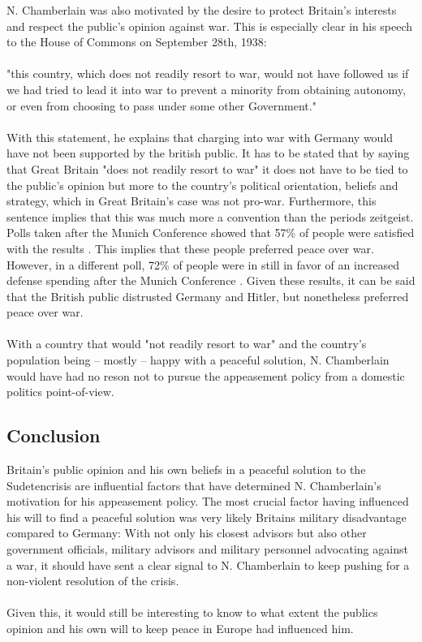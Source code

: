 \documentclass[10pt, a4papert, hidelinks]{article}
\begin{document}
N. Chamberlain was also motivated by the desire to protect Britain's interests and respect the public's opinion against war. This is especially clear in his speech to the House of Commons on September 28th, 1938:\\\\
"this country, which does not readily resort to war, would not have followed us if we had tried to lead it into war to prevent a  minority from obtaining autonomy, or even from choosing to pass under some other Government." \cite{prime_minister_statement_common_sittings_european_situation}\\\\
With this statement, he explains that charging into war with Germany would have not been supported by the british public. It has to be stated that by saying that Great Britain "does not readily resort to war" it does not have to be tied to the public's opinion but more to the country's political orientation, beliefs and strategy, which in Great Britain's case was not pro-war. Furthermore, this sentence implies that this was much more a convention than the periods zeitgeist.\\
Polls taken after the Munich Conference showed that 57\% of people were satisfied with the results \cite{times2019}. This implies that these people preferred peace over war. However, in a different poll, 72\% of people were in still in favor of an increased defense spending after the Munich Conference \cite{times2019}. Given these results, it can be said that the British public distrusted Germany and Hitler, but nonetheless preferred peace over war.\\\\
With a country that would "not readily resort to war" and the country's population being -- mostly -- happy with a peaceful solution, N. Chamberlain would have had no reson not to pursue the appeasement policy from a domestic politics point-of-view.

\subsection{Conclusion}


Britain's public opinion and his own beliefs in a peaceful solution to the Sudetencrisis are influential factors that have determined N. Chamberlain's motivation for his appeasement policy. The most crucial factor having influenced his will to find a peaceful solution was very likely Britains military disadvantage compared to Germany: With not only his closest advisors but also other government officials, military advisors and military personnel advocating against a war, it should have sent a clear signal to N. Chamberlain to keep pushing for a non-violent resolution of the crisis.\\\\
Given this, it would still be interesting to know to what extent the publics opinion and his own will to keep peace in Europe had influenced him.
\end{document}
